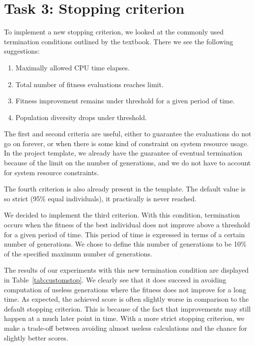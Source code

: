 \documentclass{report}
\begin{document}
\section{Task 3: Stopping criterion}
\label{sec:stopping_criterion}
To implement a new stopping criterion, we looked at the commonly used termination conditions outlined by the textbook. There we see the following suggestions:
\begin{enumerate}
	\item Maximally allowed CPU time elapses.
	\item Total number of fitness evaluations reaches limit.
	\item Fitness improvement remains under threshold for a given period of time.
	\item Population diversity drops under threshold.
\end{enumerate}
The first and second criteria are useful, either to guarantee the evaluations do not go on forever, or when there is some kind of constraint on system resource usage. In the project template, we already have the guarantee of eventual termination because of the limit on the number of generations, and we do not have to account for system resource constraints.

The fourth criterion is also already present in the template. The default value is so strict (95\% equal individuals), it practically is never reached.

We decided to implement the third criterion. With this condition, termination occurs when the fitness of the best individual does not improve above a threshold for a given period of time. This period of time is expressed in terms of a certain number of generations. We chose to define this number of generations to be 10\% of the specified maximum number of generations.

The results of our experiments with this new termination condition are displayed in Table~\ref{tab:customstop}. We clearly see that it does succeed in avoiding computation of useless generations where the fitness does not improve for a long time. As expected, the achieved score is often slightly worse in comparison to the default stopping criterion. This is because of the fact that improvements may still happen at a much later point in time. With a more strict stopping criterion, we make a trade-off between avoiding almost useless calculations and the chance for slightly better scores.

\end{document}
